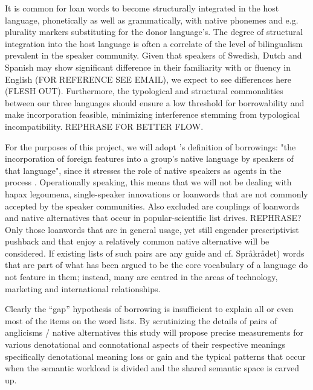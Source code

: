 \documentclass[a4paper]{article}
\begin{document}
It is common for loan words to become structurally integrated in the host language, phonetically as well as grammatically, with native phonemes and e.g. plurality markers substituting for the donor language's. The degree of structural integration into the host language is often a correlate of the level of bilingualism prevalent in the speaker community. Given that speakers of Swedish, Dutch and Spanish may show significant difference in their familiarity with or fluency in English (FOR REFERENCE SEE EMAIL), we expect to see differences here (FLESH OUT). Furthermore, the typological and structural commonalities between our three languages should ensure a low threshold for borrowability and make incorporation feasible, minimizing interference stemming from typological incompatibility. REPHRASE FOR BETTER FLOW.

For the purposes of this project, we will adopt \citet[p.37]{Thomason1988}'s definition of borrowings: "the incorporation of foreign features into a group's native language by speakers of that language", since it stresses the role of native speakers as agents in the process \citep[see also][p.12]{Winford2003}. Operationally speaking, this means that we will not be dealing with hapax legoumena, single-speaker innovations or loanwords that are not commonly accepted by the speaker communities. Also excluded are couplings of loanwords and native alternatives that occur in popular-scientific list drives. REPHRASE?
 Only those loanwords that are in general usage, yet still engender prescriptivist pushback and that enjoy a relatively common native alternative will be considered. If existing lists of such pairs are any guide  \citep[cf.][]{Koops2009} and cf. Spr\aa kr\aa det) 
 words that are part of what has been argued to be the core vocabulary of a language \citep[see][]{Swadesh1952} do not feature in them; instead, many are centred in the areas of technology, marketing and international relationships. 

Clearly the ``gap'' hypothesis of borrowing is insufficient to explain all or even most of the items on the word lists. By scrutinizing the details of pairs of anglicisms / native alternatives this study will propose precise measurements for various denotational and connotational aspects of their respective meanings specifically denotational meaning loss or gain and the typical patterns that occur when the semantic workload is divided and the shared semantic space is carved up.
\end{document}
